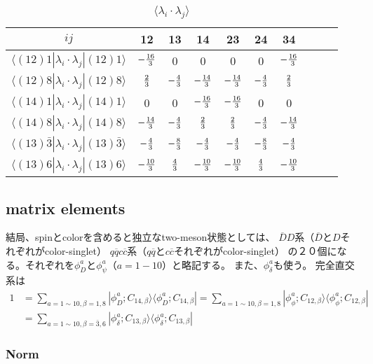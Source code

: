 \documentclass[a4j]{jarticle}
\def\bra{\langle}
\def\ket{\rangle}
\def\lamilamj{{\lambda_i\cdot\lambda_j}}
\def\cbar{\overline{{c}}}
\def\qbar{\overline{{q}}}
\def\Dbar{\overline{{D}}{}}
\begin{document}
\begin{table}[htbp]
\caption{$\bra\lamilamj\ket$}
\begin{center}
\begin{tabular}{cccccccccc}\hline
$ij$&12&13&14&23&24&34\\\hline
$\bra(12)1|\lamilamj|(12)1\ket$
& $-{16\over 3}$ & 0& 0& 0& 0&$-{16\over 3}$
\\
$\bra(12)8|\lamilamj|(12)8\ket$
& ${2\over 3}$ & $-{4\over 3}$& $-{14\over 3}$& $-{14\over 3}$&$-{4\over 3}$&$ {2\over 3}$
\\
$\bra(14)1|\lamilamj|(14)1\ket$
& 0 & 0& $-{16\over 3}$& $-{16\over 3}$& 0&0
\\
$\bra(14)8|\lamilamj|(14)8\ket$
& $-{14\over 3}$ & $-{4\over 3}$&${2\over 3}$ & ${2\over 3}$&$-{4\over 3}$& $-{14\over 3}$
\\
$\bra(13)\bar3|\lamilamj|(13)\bar3\ket$
& $-{4\over 3}$ & $-{8\over 3}$&$-{4\over 3}$& $-{4\over 3}$& $-{8\over 3}$& $-{4\over 3}$
\\
$\bra(13)6|\lamilamj|(13)6\ket$
& $-{10\over 3}$ & ${4\over 3}$&$-{10\over 3}$ & $-{10\over 3}$&${4\over 3}$& $-{10\over 3}$
\\\hline
\end{tabular}
\end{center}
\label{tbl:ss}
\end{table}%

\subsection{matrix elements}

結局、spinとcolorを含めると独立なtwo-meson状態としては、
$\Dbar D$系（$\Dbar$と$D$それぞれがcolor-singlet）
$q\qbar c\cbar$系（$q\qbar$と$c\cbar$それぞれがcolor-singlet）
の２０個になる。それぞれを$\phi_D^a$と$\phi_\psi^a$（$a=1-10$）と略記する。
また、$\phi_\delta^a$も使う。
完全直交系は
\begin{align}
1&
=\sum_{a=1\sim 10,\beta=1,8}    |\phi_D^a;C_{14,\beta}\ket\bra\phi_D^a;C_{14,\beta}|
=\sum_{a=1\sim 10,\beta=1,8}    |\phi_\phi^a;C_{12,\beta}\ket\bra\phi_\phi^a;C_{12,\beta}|
\nonumber\\
&=\sum_{a=1\sim 10,\beta=\bar3,6}|\phi_\delta^a;C_{13,\beta}\ket\bra\phi_\delta^a;C_{13,\beta}|
\end{align}
\subsubsection{Norm}
\end{document}
